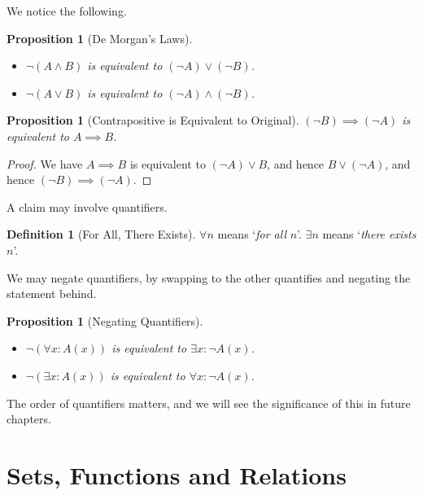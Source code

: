 \documentclass{article}
\newtheorem{proposition}[theorem]{Proposition}
\theoremstyle{definition}
\newtheorem{definition}[theorem]{Definition}
\theoremstyle{remark}
\newcommand{\pqty}[1]{\left(#1\right)}
\begin{document}
We notice the following.

\begin{proposition}[De Morgan's Laws]
    \begin{itemize}
        \item \(\lnot \pqty{A \land B}\) is equivalent to \(\pqty{\lnot A} \lor \pqty{\lnot B}\).
        \item \(\lnot \pqty{A \lor B}\) is equivalent to \(\pqty{\lnot A} \land \pqty{\lnot B}\).
    \end{itemize}
\end{proposition}

\begin{proposition}[Contrapositive is Equivalent to Original]
    \(\pqty{\lnot B} \implies \pqty{\lnot A}\) is equivalent to \(A \implies B\).
\end{proposition}

\begin{proof}
    We have \(A \implies B\) is equivalent to \(\pqty{\lnot A} \lor B\), and hence \(B \lor \pqty{\lnot A}\), and hence \(\pqty{\lnot B} \implies \pqty{\lnot A}\).
\end{proof}

A claim may involve quantifiers.

\begin{definition}[For All, There Exists]
    \(\forall n\) means `\emph{for all} \(n\)'. \(\exists n\) means `\emph{there exists} \(n\)'.
\end{definition}

We may negate quantifiers, by swapping to the other quantifies and negating the statement behind.

\begin{proposition}[Negating Quantifiers]
    \begin{itemize}
        \item \(\lnot \pqty{\forall x: A\pqty{x}}\) is equivalent to \(\exists x: \lnot A\pqty{x}\).
        \item \(\lnot \pqty{\exists x: A\pqty{x}}\) is equivalent to \(\forall x: \lnot A\pqty{x}\).
    \end{itemize}
\end{proposition}

The order of quantifiers matters, and we will see the significance of this in future chapters.

\section{Sets, Functions and Relations}
\label{sec:sets-functions-relations}
\end{document}
